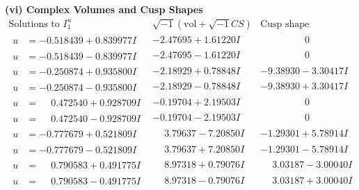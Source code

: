 \documentclass[1p]{elsarticle_modified}
\theoremstyle{definition}
\newcommand{\I}{\sqrt{-1}}
\begin{document}
\newpage\flushleft \textbf{(vi) Complex Volumes and Cusp Shapes}
$$\begin{array}{c|c|c}  
\text{Solutions to }I^u_{1}& \I (\text{vol} + \sqrt{-1}CS) & \text{Cusp shape}\\
 \hline 
\begin{aligned}
u &= -0.518439 + 0.839977 I\end{aligned}
 & -2.47695 + 1.61220 I & \phantom{-0.000000 } 0 \\ \hline\begin{aligned}
u &= -0.518439 - 0.839977 I\end{aligned}
 & -2.47695 - 1.61220 I & \phantom{-0.000000 } 0 \\ \hline\begin{aligned}
u &= -0.250874 + 0.935800 I\end{aligned}
 & -2.18929 + 0.78848 I & -9.38930 - 3.30417 I \\ \hline\begin{aligned}
u &= -0.250874 - 0.935800 I\end{aligned}
 & -2.18929 - 0.78848 I & -9.38930 + 3.30417 I \\ \hline\begin{aligned}
u &= \phantom{-}0.472540 + 0.928709 I\end{aligned}
 & -0.19704 + 2.19503 I & \phantom{-0.000000 } 0 \\ \hline\begin{aligned}
u &= \phantom{-}0.472540 - 0.928709 I\end{aligned}
 & -0.19704 - 2.19503 I & \phantom{-0.000000 } 0 \\ \hline\begin{aligned}
u &= -0.777679 + 0.521809 I\end{aligned}
 & \phantom{-}3.79637 - 7.20850 I & -1.29301 + 5.78914 I \\ \hline\begin{aligned}
u &= -0.777679 - 0.521809 I\end{aligned}
 & \phantom{-}3.79637 + 7.20850 I & -1.29301 - 5.78914 I \\ \hline\begin{aligned}
u &= \phantom{-}0.790583 + 0.491775 I\end{aligned}
 & \phantom{-}8.97318 + 0.79076 I & \phantom{-}3.03187 - 3.00040 I \\ \hline\begin{aligned}
u &= \phantom{-}0.790583 - 0.491775 I\end{aligned}
 & \phantom{-}8.97318 - 0.79076 I & \phantom{-}3.03187 + 3.00040 I \\ \hline\begin{aligned}

\end{aligned}
\end{array}$$
\end{document}
